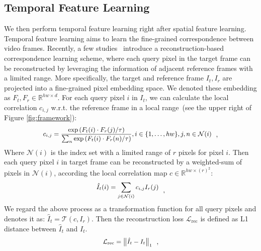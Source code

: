 \documentclass{article}
\begin{document}
\subsection{Temporal Feature Learning}
\label{temporal_feature_learning}
We then perform temporal feature learning right after spatial feature learning. Temporal feature learning aims to learn the fine-grained correspondence between video frames. Recently, a few studies~\cite{lai2020mast}\cite{vondrick2018tracking} introduce a reconstruction-based correspondence learning scheme, where each query pixel in the target frame can be reconstructed by leveraging the information of adjacent reference frames with a limited range. More specifically, the target and reference frame $I_{t}, I_r$ are projected into a  fine-grained pixel embedding space. We denoted these embedding as $F_t,F_{r} \in \mathbb{R}^{hw \times d}$. For each query pixel $i$ in $I_{t}$, we can calculate the local correlation $c_{i,j}$ w.r.t. the reference frame in a local range~(see the upper right of Figure \ref{fig:framework}):
\begin{equation}\label{eq:local_correlation}
  \small
  \begin{aligned}
    c_{i, j}=\frac{\exp \left(F_t(i)  \cdot F_r(j) / \tau\right)}{\sum_{n} \exp \left(F_t(i) \cdot F_r(n) / \tau\right)}, i \in \{1,\ldots,hw\}, j,n \in \mathcal{N}(i)
  \end{aligned}~~,
\end{equation}
Where $\mathcal{N}(i)$ is the index set with a limited range of $r$ pixels for pixel $i$. Then each query pixel $i$ in target frame can be reconstructed by a weighted-sum of pixels in $\mathcal{N}(i)$, according the local correlation map $c \in \mathbb{R}^{hw \times (r)^2}$:
\begin{equation}\label{eq:reconstruction}
  \small
  \begin{aligned}
    \hat{I}_{t}(i)=\sum_{j \in \mathcal{N}(i)} c_{i,j} I_{r}(j)
  \end{aligned}~~,
\end{equation}
We regard the above process as a transformation function for all query pixels and denotes it as: $\hat{I}_{t} = \mathcal{T}\left(c, I_r\right)$. Then the reconstruction loss $\mathcal{L}_{\mathrm{rec}}$ is defined as L1 distance between $\hat{I}_{t}$ and $I_{t}$.
\begin{equation}\label{eq:reconstruction loss}
  \small
  \begin{aligned}
    \mathcal{L}_{\mathrm{rec}}=\left\|\hat{I}_{t} - I_{t}\right\|_{1}
  \end{aligned}~~,
\end{equation}
\end{document}
